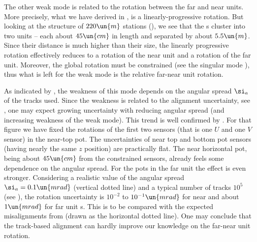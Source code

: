 
The other weak mode is related to the rotation between the far and near units. More precisely, what we have derived in , is a linearly-progressive rotation. But looking at the structure of $220\un{m}$ stations (), we see that the s cluster into two units -- each about $45\un{cm}$ in length and separated by about $5.5\un{m}$. Since their distance is much higher than their size, the linearly progressive rotation effectively reduces to a rotation of the near unit and a rotation of the far unit. Moreover, the global rotation must be constrained (see the singular mode ), thus what is left for the weak mode is the relative far-near unit rotation.

As indicated by , the weakness of this mode depends on the angular spread $\si_a$ of the tracks used. Since the weakness is related to the alignment uncertainty, see , one may expect growing uncertainty with reducing angular spread (and increasing weakness of the weak mode). This trend is well confirmed by . For that figure we have fixed the rotations of the first two sensors (that is one $U$ and one $V$ sensor) in the near-top pot. The uncertainties of near top and bottom pot sensors (having nearly the same $z$ position) are practically flat. The near horizontal pot, being about $45\un{cm}$ from the constrained sensors, already feels some dependence on the angular spread. For the pots in the far unit the effect is even stronger. Considering a realistic value of the angular spread $\si_a =  0.1\un{mrad}$ (vertical dotted line) and a typical number of tracks $10^5$ (see ), the rotation uncertainty is $10^{-2}$ to $10^{-1}\un{mrad}$ for near and about $1\un{mrad}$ for far unit s. This is to be compared with the expected misalignments from  (drawn as the horizontal dotted line). One may conclude that the track-based alignment can hardly improve our knowledge on the far-near unit rotation.

